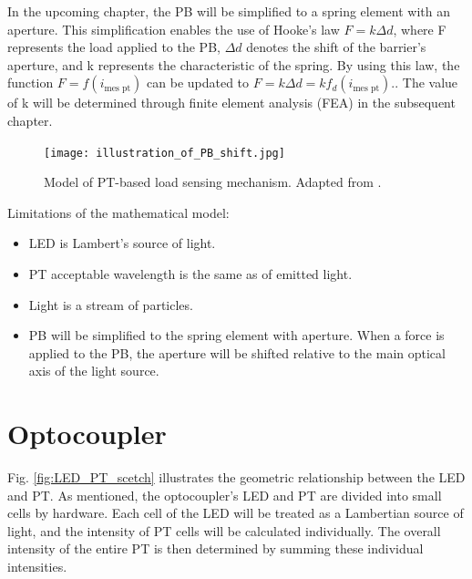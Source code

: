 In the upcoming chapter, the PB will be simplified to a spring element with an aperture. 
This simplification enables the use of Hooke's law $F = k\Delta d$, where F represents the load applied 
to the PB, $\Delta d$ denotes the shift of the barrier's aperture, and k represents the 
characteristic of the spring. 
By using this law, the function $F = f(i_{\text{mes pt}})$ can be updated to $F = k \Delta d = k f_d(i_{\text{mes pt}})$..
The value of k will be determined through finite element analysis (FEA) in the subsequent chapter. 

\begin{figure}[H]
  \centering
  \texttt{[image: illustration\_of\_PB\_shift.jpg]}
  \caption{Model of PT-based load sensing mechanism. Adapted from \cite[Fig. 1]{my_love_pressure_photosensor}.}
  \label{fig:load_pt_based_mechanism}
  \end{figure}

Limitations of the mathematical model:
\begin{itemize}
    \item LED is Lambert's source of light.
    \item PT acceptable wavelength is the same as of emitted light.
    \item Light is a stream of particles.
    \item PB will be simplified to the spring element with aperture. When a force is applied to the PB, the aperture will be shifted relative to the main optical axis of the light source.
\end{itemize}

\section{Optocoupler}
Fig. \ref{fig:LED_PT_scetch} illustrates the geometric relationship between the LED and PT. 
As mentioned, the optocoupler's LED and PT are divided into small cells by hardware.
 Each cell of the LED will be treated as a Lambertian source of light, and the intensity 
 of PT cells will be calculated individually. 
 The overall intensity of the entire PT is then determined by summing these individual intensities. 

